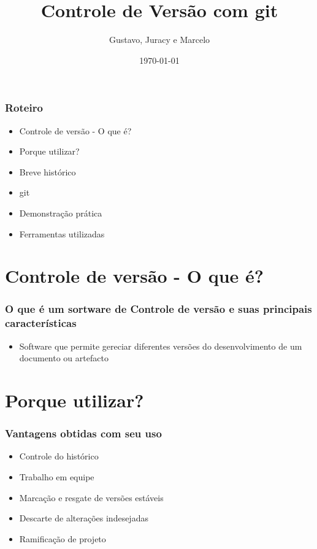 \documentclass{beamer}
\title[Gerência de Configuração e Testes]{Controle de Versão com git}
\author[Grupo Masters]{Gustavo, Juracy e Marcelo}
\institute{Centro Universitário Jorge Amado}
\date{\today}
\begin{document}
  \frame{\titlepage}
    \begin{frame}
    \frametitle{Roteiro}
   	\begin{itemize}
      \item Controle de versão - O que é?
      \item Porque utilizar?
      \item Breve histórico
      \item git
      \item Demonstração prática
      \item Ferramentas utilizadas
    \end{itemize}
  \end{frame}

  \section{Controle de versão - O que é?}
  \begin{frame}
    \frametitle{O que é um sortware de Controle de versão e suas principais características}
    \begin{itemize}
      \item Software que permite gereciar diferentes versões do desenvolvimento de um documento ou artefacto
    \end{itemize}
    \vfill
  \end{frame}

  \section{Porque utilizar?}
  \begin{frame}
    \frametitle{Vantagens obtidas com seu uso}
    \begin{itemize}
      \item Controle do histórico
      \item Trabalho em equipe
      \item Marcação e resgate de versões estáveis
      \item Descarte de alterações indesejadas
      \item Ramificação de projeto
    \end{itemize}
    \vfill
  \end{frame}
\end{document}
